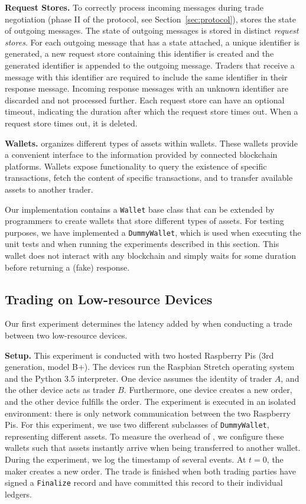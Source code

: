 \textbf{Request Stores.}
To correctly process incoming messages during trade negotiation (phase II of the \ModelName{} protocol, see Section~\ref{sec:protocol}), \ModelName{} stores the state of outgoing messages.
The state of outgoing messages is stored in distinct \emph{request stores}.
For each outgoing message that has a state attached, a unique identifier is generated, a new request store containing this identifier is created and the generated identifier is appended to the outgoing message.
Traders that receive a message with this identifier are required to include the same identifier in their response message.
Incoming response messages with an unknown identifier are discarded and not processed further.
Each request store can have an optional timeout, indicating the duration after which the request store times out.
When a request store times out, it is deleted.

\textbf{Wallets.}
\ModelName{} organizes different types of assets within wallets.
These wallets provide a convenient interface to the information provided by connected blockchain platforms.
Wallets expose functionality to query the existence of specific transactions, fetch the content of specific transactions, and to transfer available assets to another trader.

Our implementation contains a \texttt{Wallet} base class that can be extended by programmers to create wallets that store different types of assets.
For testing purposes, we have implemented a \texttt{DummyWallet}, which is used when executing the unit tests and when running the experiments described in this section.
This wallet does not interact with any blockchain and simply waits for some duration before returning a (fake) response.

\subsection{Trading on Low-resource Devices}
\label{sec:exp_trading_low_devices}
Our first experiment determines the latency added by \ModelName{} when conducting a trade between two low-resource devices.

\textbf{Setup.}
This experiment is conducted with two hosted Raspberry Pis (3rd generation, model B+).
The devices run the Raspbian Stretch operating system and the Python 3.5 interpreter.
One device assumes the identity of trader $ A $, and the other device acts as trader $ B $.
Furthermore, one device creates a new order, and the other device fulfills the order.
The experiment is executed in an isolated environment: there is only network communication between the two Raspberry Pis.
For this experiment, we use two different subclasses of \texttt{DummyWallet}, representing different assets.
To measure the overhead of \ModelName{}, we configure these wallets such that assets instantly arrive when being transferred to another wallet.
During the experiment, we log the timestamp of several events.
At $ t=0 $, the maker creates a new order.
The trade is finished when both trading parties have signed a \texttt{Finalize} record and have committed this record to their individual ledgers.

